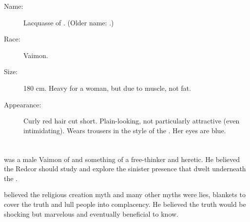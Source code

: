\begin{description}
  \item[Name:] 
    \Ryzin{} \Laetitia{} Lacquasse of \ClanRedcor. 
    (Older name: \Brizen{}.)
  \item[Race:] Vaimon. 
  \item[Size:] 180 cm. Heavy for a woman, but due to muscle, not fat. 
  \item[Appearance:] Curly red hair cut short. Plain-looking, not particularly attractive (even intimidating). Wears trousers in the style of the \Ryzin. Her eyes are blue. 
\end{description}















\section{\PatriccoKimon}
\index{\PatriccoKimon}
\index{\Kimon!\PatriccoKimon}
\PatriccoKimon was a male Vaimon of \ClanRedcor and something of a free-thinker and heretic. 
He believed the Redcor should study and explore the sinister presence that dwelt underneath the \TopazChateau. 

\Kimon believed the religious creation myth and many other myths were lies, blankets to cover the truth and lull people into complacency.
He believed the truth would be shocking but marvelous and eventually beneficial to know. 

